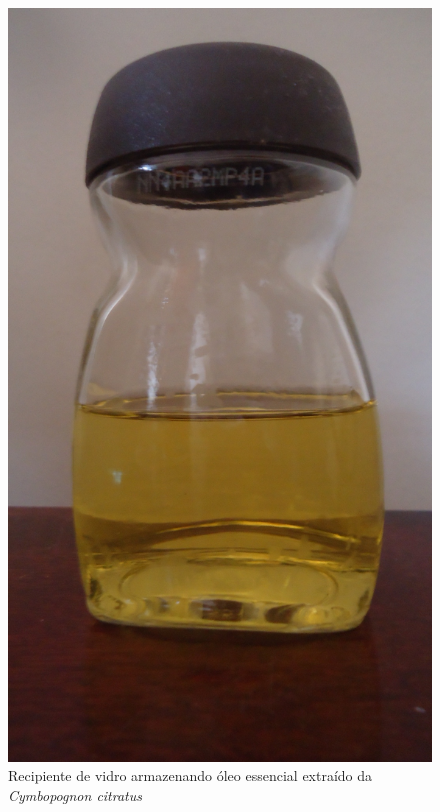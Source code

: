 \documentclass[
	article,			%
	11pt,				%
	oneside,			%
	a4paper,			%
	english,			%
	brazil,				%
	]{abntex2}
\begin{document}
\begin{figure}[tb]
	\begin{center}
		\includegraphics[scale=0.1]{imgs/oleo_essencial.jpg} 
		\caption{Recipiente de vidro armazenando óleo essencial extraído da \emph{Cymbopognon citratus}}
		\label{fig:oleo_essencial}
	\end{center}
\end{figure}
\end{document}
